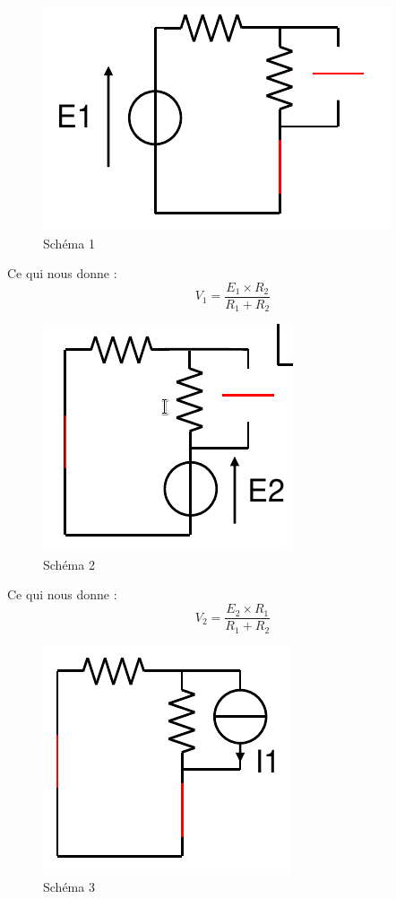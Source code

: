 \documentclass[a4paper,10pt]{article}
\begin{document}
\begin{figure}[h!]
 \begin{center}
  \includegraphics[scale=0.3]{superposition1}
  \caption{Schéma 1}
 \end{center}
\end{figure}

Ce qui nous donne : $$V_1=\frac{E_1\times R_2}{R_1+R_2}$$

\begin{figure}[h!]
 \begin{center}
  \includegraphics[scale=0.3]{superposition2}
  \caption{Schéma 2}
 \end{center}
\end{figure}

Ce qui nous donne : $$V_2=\frac{E_2\times R_1}{R_1+R_2}$$

\begin{figure}[h!]
 \begin{center}
  \includegraphics[scale=0.3]{superposition3}
  \caption{Schéma 3}
 \end{center}
\end{figure}
\end{document}
